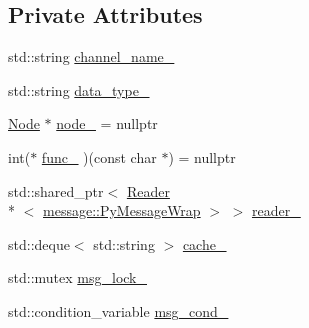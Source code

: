 \subsection*{Private Attributes}
\begin{DoxyCompactItemize}
\item 
std\-::string \hyperlink{classapollo_1_1cyber_1_1PyReader_ad351960d55897e870477559d435edf44}{channel\-\_\-name\-\_\-}
\item 
std\-::string \hyperlink{classapollo_1_1cyber_1_1PyReader_ad76d5814bde082f4cfb80a6530e8fea2}{data\-\_\-type\-\_\-}
\item 
\hyperlink{classapollo_1_1cyber_1_1Node}{Node} $\ast$ \hyperlink{classapollo_1_1cyber_1_1PyReader_a536eec8704c82a257a9d5055ce423186}{node\-\_\-} = nullptr
\item 
int($\ast$ \hyperlink{classapollo_1_1cyber_1_1PyReader_a5ac7fd363685049b09cb164e44b94290}{func\-\_\-} )(const char $\ast$) = nullptr
\item 
std\-::shared\-\_\-ptr$<$ \hyperlink{classapollo_1_1cyber_1_1Reader}{Reader}\\*
$<$ \hyperlink{classapollo_1_1cyber_1_1message_1_1PyMessageWrap}{message\-::\-Py\-Message\-Wrap} $>$ $>$ \hyperlink{classapollo_1_1cyber_1_1PyReader_abf457a5943e3bb6e4ad42349ff864688}{reader\-\_\-}
\item 
std\-::deque$<$ std\-::string $>$ \hyperlink{classapollo_1_1cyber_1_1PyReader_a5d52ffc981f3a9f4a73db50a0e581951}{cache\-\_\-}
\item 
std\-::mutex \hyperlink{classapollo_1_1cyber_1_1PyReader_a65d8b0d144d43363766a7b30739d3ae9}{msg\-\_\-lock\-\_\-}
\item 
std\-::condition\-\_\-variable \hyperlink{classapollo_1_1cyber_1_1PyReader_afef93e420ce1fe81783ee2e533aff74b}{msg\-\_\-cond\-\_\-}
\end{DoxyCompactItemize}


